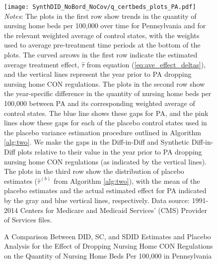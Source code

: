 \documentclass[../Main.tex]{subfiles}
\begin{document}
\newpage
{}
\begin{figure}[t] 
    \setlength{}
	\caption{\label{fig:q_certbeds_plots_pa} \centering A Comparison Between DID, SC, and SDID Estimates and Placebo Analysis for the Effect of Dropping Nursing Home CON Regulations on the Quantity of Nursing Home Beds Per 100,000 in Pennsylvania} {\centering\texttt{[image: SynthDID\_NoBord\_NoCov/q\_certbeds\_plots\_PA.pdf]}}
    \vspace{-1.4cm}\\
    \scriptsize
		\textit{Notes}: The plots in the first row show trends in the quantity of nursing home beds per 100,000 over time for Pennsylvania and for the relevant weighted average of control states, with the weights used to average pre-treatment time periods at the bottom of the plots. The curved arrows in the first row indicate the estimated average treatment effect, $\hat{\tau}$ from equation (\ref{eq:ave_effect_deltas}), and the vertical lines represent the year prior to PA dropping nursing home CON regulations. The plots in the second row show the year-specific difference in the quantity of nursing home beds per 100,000 between PA and its corresponding weighted average of control states. The blue line shows these gaps for PA, and the pink lines show these gaps for each of the placebo control states used in the placebo variance estimation procedure outlined in Algorithm \ref{alg:two}. We make the gaps in the Diff-in-Diff and Synthetic Diff-in-Diff plots relative to their value in the year prior to PA dropping nursing home CON regulations (as indicated by the vertical lines). The plots in the third row show the distribution of placebo estimates ($\hat{\tau}^{(b)}$ from Algorithm \ref{alg:two}), with the mean of the placebo estimates and the actual estimated effect for PA indicated by the gray and blue vertical lines, respectively. Data source: 1991-2014 Centers for Medicare and Medicaid Services’ (CMS) Provider of Services files.
\end{figure}
\restoregeometry
\clearpage
\end{document}
